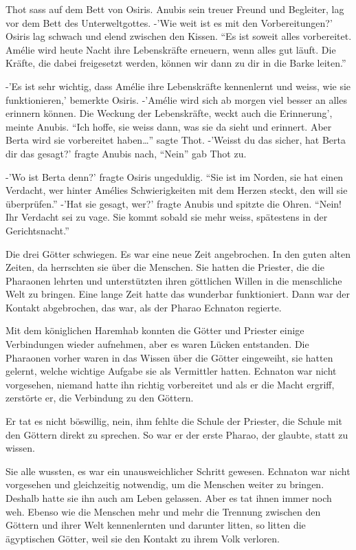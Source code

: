 \documentclass[11pt,titlepage,a5paper]{book}
\begin{document}
Thot sass auf dem Bett von Osiris. Anubis sein treuer Freund und Begleiter, lag vor dem Bett des Unterweltgottes. -'Wie weit ist es mit den Vorbereitungen?' Osiris lag schwach und elend zwischen den Kissen. "`Es ist soweit alles vorbereitet. Amélie wird heute Nacht ihre Lebenskräfte erneuern, wenn alles gut läuft. Die Kräfte, die dabei freigesetzt werden, können wir dann zu dir in die Barke leiten."'

-'Es ist sehr wichtig, dass Amélie ihre Lebenskräfte kennenlernt und weiss, wie sie funktionieren,' bemerkte Osiris. -'Amélie wird sich ab morgen viel besser an alles erinnern können. Die Weckung der Lebenskräfte, weckt auch die Erinnerung', meinte Anubis. "`Ich hoffe, sie weiss dann, was sie da sieht und erinnert. Aber Berta wird sie vorbereitet haben\dots"' sagte Thot. -'Weisst du das sicher, hat Berta dir das gesagt?' fragte Anubis nach, "`Nein"' gab Thot zu. 

-'Wo ist Berta denn?' fragte Osiris ungeduldig. "`Sie ist im Norden, sie hat einen Verdacht, wer hinter Amélies Schwierigkeiten mit dem Herzen steckt, den will sie überprüfen."' -'Hat sie gesagt, wer?' fragte Anubis und spitzte die Ohren. "`Nein! Ihr Verdacht sei zu vage. Sie kommt sobald sie mehr weiss, spätestens in der Gerichtsnacht."'

Die drei Götter schwiegen. Es war eine neue Zeit angebrochen. In den guten alten Zeiten, da herrschten sie über die Menschen. Sie hatten die Priester, die die Pharaonen lehrten und unterstützten ihren göttlichen Willen in die menschliche Welt zu bringen. Eine lange Zeit hatte das wunderbar funktioniert. Dann war der Kontakt abgebrochen, das war, als der Pharao Echnaton regierte.

Mit dem königlichen Haremhab konnten die Götter und Priester einige Verbindungen wieder aufnehmen, aber es waren Lücken entstanden. Die Pharaonen vorher waren in das Wissen über die Götter eingeweiht, sie hatten gelernt, welche wichtige Aufgabe sie als Vermittler hatten. Echnaton war nicht vorgesehen, niemand hatte ihn richtig vorbereitet und als er die Macht ergriff, zerstörte er, die Verbindung zu den Göttern.

Er tat es nicht böswillig, nein, ihm fehlte die Schule der Priester, die Schule mit den Göttern direkt zu sprechen. So war er der erste Pharao, der glaubte, statt zu wissen. 

Sie alle wussten, es war ein unausweichlicher Schritt gewesen. Echnaton war nicht vorgesehen und gleichzeitig notwendig, um die Menschen weiter zu bringen. Deshalb hatte sie ihn auch am Leben gelassen. Aber es tat ihnen immer noch weh. Ebenso wie die Menschen mehr und mehr die Trennung zwischen den Göttern und ihrer Welt kennenlernten und darunter litten, so litten die ägyptischen Götter, weil sie den Kontakt zu ihrem Volk verloren.
\end{document}
